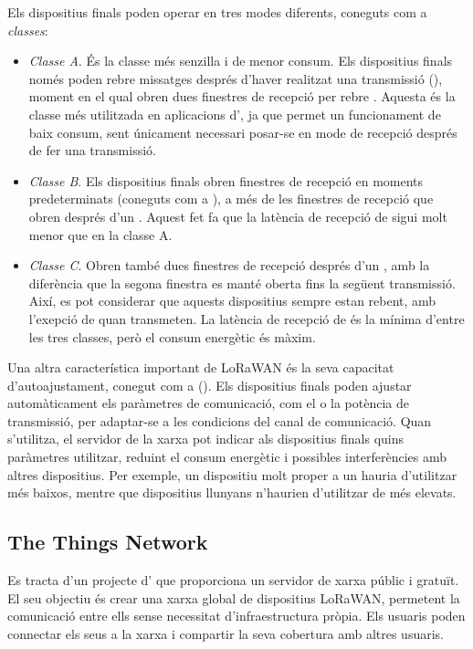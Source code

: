 \documentclass{tfgitic}[2024/07/01]
\begin{document}
Els dispositius finals poden operar en tres modes diferents, coneguts com a \emph{classes}:
\begin{itemize}
    \item \emph{Classe A}. És la classe més senzilla i de menor consum. Els dispositius finals només poden rebre missatges després d'haver realitzat una transmissió (), moment en el qual obren dues finestres de recepció per rebre . Aquesta és la classe més utilitzada en aplicacions d', ja que permet un funcionament de baix consum, sent únicament necessari posar-se en mode de recepció després de fer una transmissió.
    \item \emph{Classe B}. Els dispositius finals obren finestres de recepció en moments predeterminats (coneguts com a ), a més de les finestres de recepció que obren després d'un . Aquest fet fa que la latència de recepció de  sigui molt menor que en la classe A.
    \item \emph{Classe C}. Obren també dues finestres de recepció després d'un , amb la diferència que la segona finestra es manté oberta fins la següent transmissió. Així, es pot considerar que aquests dispositius sempre estan rebent, amb l'exepció de quan transmeten. La latència de recepció de  és la mínima d'entre les tres classes, però el consum energètic és màxim.
\end{itemize}

Una altra característica important de LoRaWAN és la seva capacitat d'autoajustament, conegut com a  (). Els dispositius finals poden ajustar automàticament els paràmetres de comunicació, com el  o la potència de transmissió, per adaptar-se a les condicions del canal de comunicació. Quan s'utilitza, el servidor de la xarxa pot indicar als dispositius finals quins paràmetres utilitzar, reduint el consum energètic i possibles interferències amb altres dispositius. Per exemple, un dispositiu molt proper a un  hauria d'utilitzar  més baixos, mentre que dispositius llunyans n'haurien d'utilitzar de més elevats.

\subsection{The Things Network}
Es tracta d'un projecte d' que proporciona un servidor de xarxa públic i gratuït. El seu objectiu és crear una xarxa global de dispositius LoRaWAN, permetent la comunicació entre ells sense necessitat d'infraestructura pròpia. Els usuaris poden connectar els seus  a la xarxa i compartir la seva cobertura amb altres usuaris.
\end{document}
